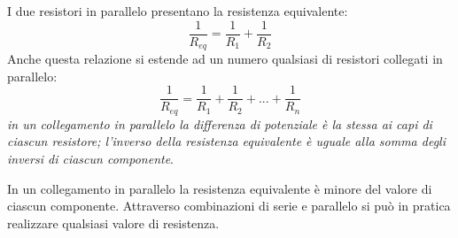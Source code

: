 \documentclass[class=book, crop=false, oneside, 12pt]{standalone}
\begin{document}
I due resistori in parallelo presentano la resistenza equivalente: 
\begin{equation*}
    \frac{1}{R_{eq}} = \frac{1}{R_1} + \frac{1}{R_2}
\end{equation*}
Anche questa relazione si estende ad un numero qualsiasi di resistori collegati in parallelo: 
\begin{equation}
    \frac{1}{R_{eq}} = \frac{1}{R_1} + \frac{1}{R_2} + ... + \frac{1}{R_n}
\end{equation}
\emph{in un collegamento in parallelo la differenza di potenziale è la stessa ai capi di ciascun resistore; l'inverso della resistenza equivalente è uguale alla somma degli inversi di ciascun componente}.

In un collegamento in parallelo la resistenza equivalente è minore del valore di ciascun componente.  
Attraverso combinazioni di serie e parallelo si può in pratica realizzare qualsiasi valore di resistenza.
\end{document}
